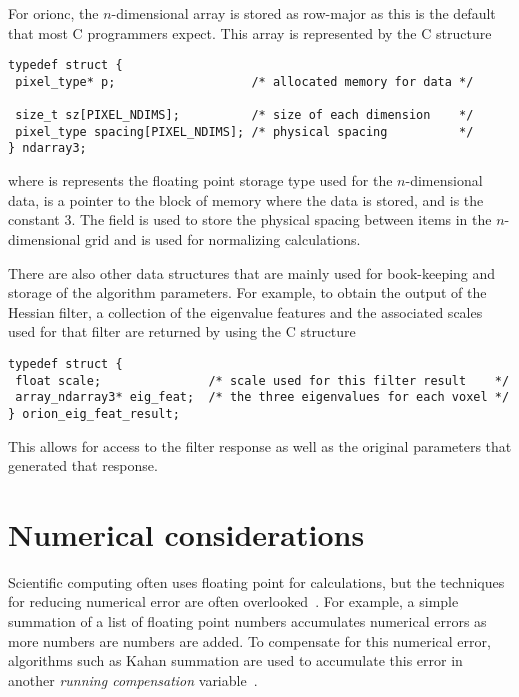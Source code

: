 For \gls{orionc}, the \(n\)-dimensional array  is stored as row-major
as this is the default that most C programmers expect. This array is
represented by the C structure
\begin{lstlisting}
typedef struct {
 pixel_type* p;                   /* allocated memory for data */

 size_t sz[PIXEL_NDIMS];          /* size of each dimension    */
 pixel_type spacing[PIXEL_NDIMS]; /* physical spacing          */
} ndarray3;
\end{lstlisting}
where
 is represents the floating point storage type used
for the \(n\)-dimensional data,  is a pointer to the block of
memory where the data is stored, and  is the constant
\num{3}.
 The  field is used to
store the physical spacing between items in the \(n\)-dimensional grid and is
used for normalizing calculations.

There are also other data structures that are mainly used for book-keeping and
storage of the algorithm parameters. For example, to obtain the output of the
Hessian filter, a collection of the eigenvalue features and the
associated scales used for that filter are returned by using the C structure
\begin{lstlisting}
typedef struct {
 float scale;               /* scale used for this filter result    */
 array_ndarray3* eig_feat;  /* the three eigenvalues for each voxel */
} orion_eig_feat_result;
\end{lstlisting}
This allows for access to the filter response as well as
the original parameters that generated that response.

\section{Numerical considerations}

Scientific computing often uses floating point for calculations, but the
techniques for reducing numerical error are often overlooked~\autocite{Goldberg:1991:floating}.
For example, a simple summation of a list of floating point numbers accumulates
numerical errors as more numbers are numbers are added. To compensate for this
numerical error, algorithms such as Kahan summation are used to accumulate this error
in another \emph{running compensation} variable~\autocite{Kahan:1965:summation}.

